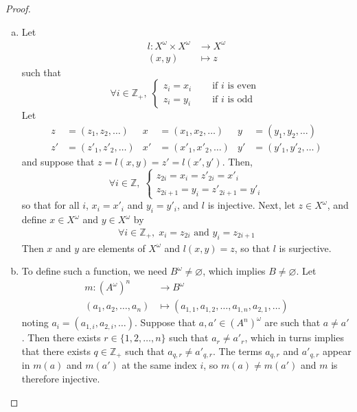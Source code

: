 \documentclass[11pt,a4paper,twoside]{article}
\theoremstyle{definition}
\begin{document}
\begin{proof}
\begin{enumerate}[(a)]
  \item Let
    \begin{align*}
      l : X^\omega \times X^\omega &\to X^\omega \\
      (x, y) &\mapsto z
    \end{align*}
    such that
    \begin{equation*}
      \forall i \in \mathbb{Z}_+, \; \begin{cases}
        z_i = x_i &\quad\text{ if $i$ is even } \\
        z_i = y_i &\quad\text{ if $i$ is odd }
      \end{cases}
    \end{equation*}
    Let
    \begin{align*}
      z &= (z_1, z_2, \dotsc) & x &= (x_1, x_2, \dotsc) & y &= (y_1, y_2, \dotsc) \\
      z' &= (z'_1, z'_2, \dotsc) & x' &= (x'_1, x'_2, \dotsc) & y' &= (y'_1, y'_2, \dotsc)
    \end{align*}
    and suppose that $z = l (x, y) = z' = l (x', y')$. Then,
    \begin{equation*}
      \forall i \in \mathbb{Z}, \; \begin{cases}
        z_{2 i} = x_i = z'_{2 i} = x'_i \\
        z_{2 i + 1} = y_i = z'_{2 i + 1} = y'_i
      \end{cases}
    \end{equation*}
    so that for all $i$, $x_i = x'_i$ and $y_i = y'_i$, and $l$ is injective.
    Next, let $z \in X^\omega$, and define $x \in X^\omega$ and $y \in X^\omega$ by
    \begin{align*}
      \forall i \in \mathbb{Z}_+, \; x_i = z_{2 i} \text{ and } y_i = z_{2 i + 1}
    \end{align*}
    Then $x$ and $y$ are elements of $X^\omega$ and $l (x, y) = z$, so that $l$ is surjective.

  \item To define such a function, we need $B^\omega \neq \varnothing$, which implies $B \neq \varnothing$.
    Let
    \begin{align*}
      m : (A^\omega)^n &\to B^\omega \\
      (a_1, a_2, \dotsc, a_n) &\mapsto (a_{1, 1}, a_{1, 2}, \dotsc, a_{1, n}, a_{2, 1}, \dotsc )
    \end{align*}
    noting $a_i = (a_{1, i}, a_{2, i}, \dotsc)$.
    Suppose that $a, a' \in (A^n)^\omega$ are such that $a \neq a'$. Then there exists $r \in \{ 1, 2, \dotsc, n \}$ such that $a_r \neq a'_r$,
    which in turns implies that there exists $q \in \mathbb{Z}_+$ such that $a_{q, r} \neq a'_{q, r}$. The terms
    $a_{q, r}$ and $a'_{q, r}$ appear in $m (a)$ and $m (a')$ at the same index $i$, so $m (a) \neq m (a')$ and $m$ is therefore injective.

  \end{enumerate}

\end{proof}
\end{document}
